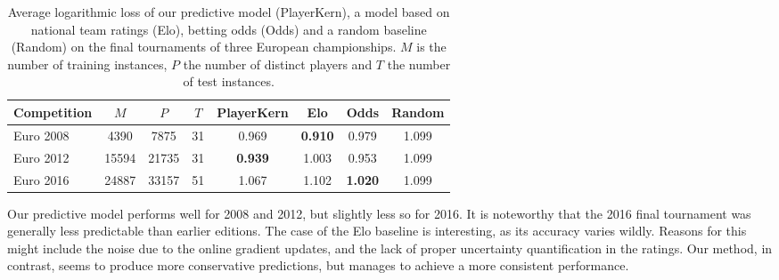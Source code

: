 \begin{table}
  \caption{
  Average logarithmic loss of our predictive model (PlayerKern), a model based on national team ratings (Elo), betting odds (Odds) and a random baseline (Random) on the final tournaments of three European championships.
  $M$ is the number of training instances, $P$ the number of distinct players and $T$ the number of test instances.}
  \label{pk:tab:eval}
  \centering
  \begin{tabular}{
    l
    *{2}{S[table-format=5]}
    S[table-format=2]
    *{4}{S[table-format=1.3]}
  }
    \toprule
    Competition &   $M$ &   $P$ & $T$ &    {PlayerKern} &           {Elo} &          {Odds} & {Random} \\
    \midrule
    Euro 2008   &  4390 &  7875 &  31 &           0.969 & \bfseries 0.910 &           0.979 &    1.099 \\
    Euro 2012   & 15594 & 21735 &  31 & \bfseries 0.939 &           1.003 &           0.953 &    1.099 \\
    Euro 2016   & 24887 & 33157 &  51 &           1.067 &           1.102 & \bfseries 1.020 &    1.099 \\
    \bottomrule
  \end{tabular}
\end{table}

Our predictive model performs well for 2008 and 2012, but slightly less so for 2016.
It is noteworthy that the 2016 final tournament was generally less predictable than earlier editions.
The case of the Elo baseline is interesting, as its accuracy varies wildly.
Reasons for this might include the noise due to the online gradient updates, and the lack of proper uncertainty quantification in the ratings.
Our method, in contrast, seems to produce more conservative predictions, but manages to achieve a more consistent performance.
